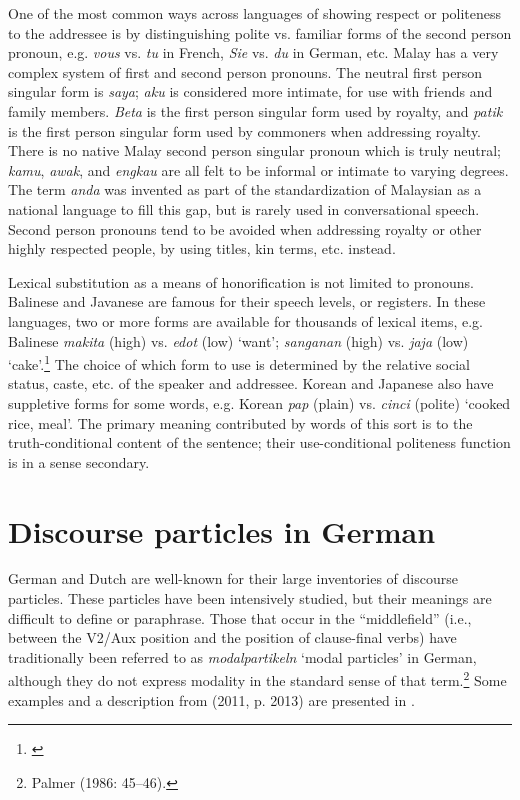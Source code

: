 One of the most common ways across languages of showing respect or politeness to the addressee is by distinguishing polite vs. familiar forms of the second person pronoun, e.g. \textit{vous} vs. \textit{tu} in French, \textit{Sie} vs. \textit{du} in German, etc. Malay has a very complex system of first and second person pronouns. The neutral first person singular form is \textit{saya}; \textit{aku} is considered more intimate, for use with friends and family members. \textit{Beta} is the first person singular form used by royalty, and \textit{patik} is the first person singular form used by commoners when addressing royalty. There is no native Malay second person singular pronoun which is truly neutral; \textit{kamu}, \textit{awak}, and \textit{engkau} are all felt to be informal or intimate to varying degrees. The term \textit{anda} was invented as part of the standardization of Malaysian as a national language to fill this gap, but is rarely used in conversational speech. Second person pronouns tend to be avoided when addressing royalty or other highly respected people, by using titles, kin terms, etc. instead.



Lexical substitution as a means of honorification is not limited to pronouns. Balinese and Javanese are famous for their speech levels, or registers. In these languages, two or more forms are available for thousands of lexical items, e.g. Balinese \textit{makita} (high) vs. \textit{edot} (low) ‘want’; \textit{sanganan} (high) vs. \textit{jaja} (low) ‘cake’.\footnote{\citet{Arka2005}} The choice of which form to use is determined by the relative social status, caste, etc. of the speaker and addressee. Korean and Japanese also have suppletive forms for some words, e.g. Korean \textit{pap} (plain) vs. \textit{cinci} (polite) ‘cooked rice, meal’. The primary meaning contributed by words of this sort is to the truth-conditional content of the sentence; their use-conditional politeness function is in a sense secondary.


\section{Discourse particles in German}\label{sec:11.6}

German and Dutch are well-known for their large inventories of discourse particles. These particles have been intensively studied, but their meanings are difficult to define or paraphrase. Those that occur in the “middlefield” (i.e., between the V2/Aux position and the position of clause-final verbs) have traditionally been referred to as \textit{modalpartikeln} ‘modal particles’ in German, although they do not express modality in the standard sense of that term.\footnote{Palmer (1986: 45–46).} Some examples and a description from \citeauthor{Zimmermann2011} (2011, p. 2013) are presented in .


